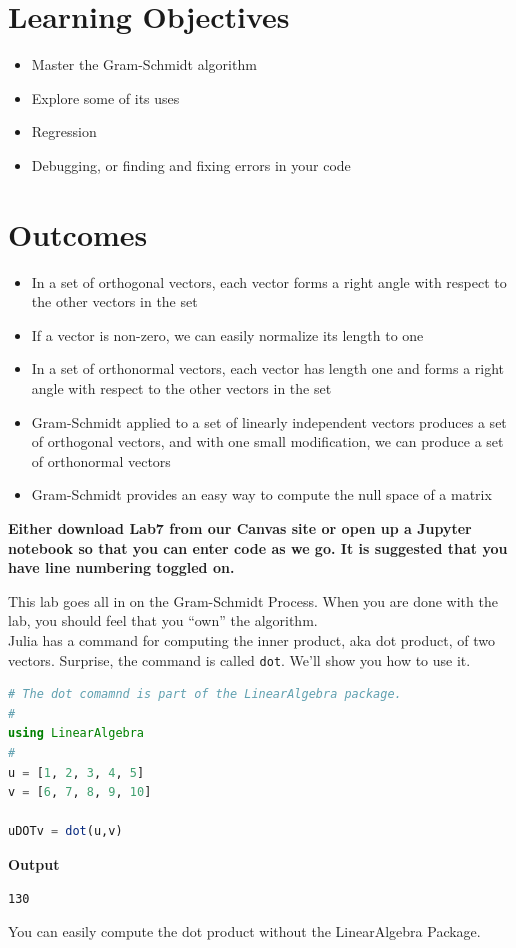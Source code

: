 \section*{Learning Objectives}

\begin{itemize}
\item Master the Gram-Schmidt algorithm
\item Explore some of its uses
\item Regression
\item Debugging, or finding and fixing errors in your code
\end{itemize}

\section*{Outcomes} 
\begin{itemize}
\item In a set of orthogonal vectors, each vector forms a right angle with respect to the other vectors in the set
\item If a vector is non-zero, we can easily normalize its length to one
\item In a set of orthonormal vectors, each vector has length one and forms a right angle with respect to the other vectors in the set 
\item Gram-Schmidt applied to a set of linearly independent vectors produces a set of orthogonal vectors, and with one small modification, we can produce a set of orthonormal vectors
\item Gram-Schmidt provides an easy way to compute the null space of a matrix
\end{itemize}

\vspace*{1cm}

\textbf{Either download Lab7 from our Canvas site or open up a Jupyter notebook so that you can enter code as we go. It is suggested that you have line numbering toggled on.}  

\newpage

This lab goes all in on the Gram-Schmidt Process. When you are done with the lab, you should feel that you ``own'' the algorithm. \\

Julia has a command for computing the inner product, aka dot product, of two vectors. Surprise, the command is called \texttt{dot}. We'll show you how to use it.

\begin{lstlisting}[language=Julia,style=mystyle]
# The dot comamnd is part of the LinearAlgebra package.
#
using LinearAlgebra
#
u = [1, 2, 3, 4, 5]
v = [6, 7, 8, 9, 10]

uDOTv = dot(u,v)
\end{lstlisting}
\textbf{Output} 
\begin{verbatim}
130
\end{verbatim}
You can easily compute the dot product without the LinearAlgebra Package. 

